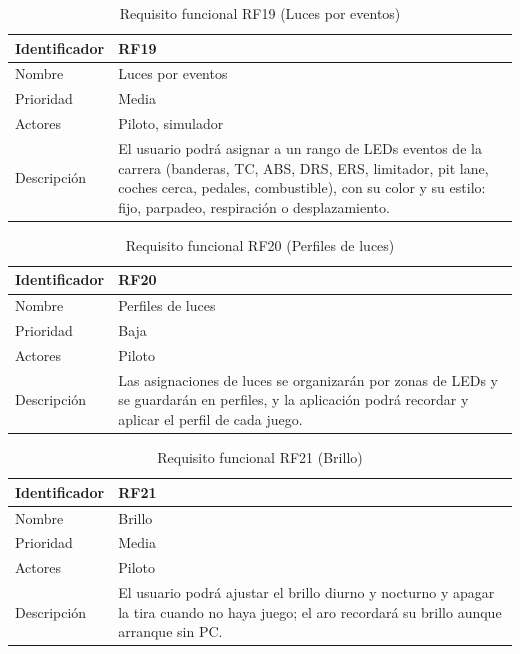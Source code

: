 \begin{table}[H]
	\centering
	\renewcommand{\arraystretch}{2}
	\begin{tabular}{|l|p{10cm}|}
		\hline
		Identificador & RF19 \\
		\hline
		Nombre & Luces por eventos \\
		\hline
		Prioridad & Media \\
		\hline
		Actores & Piloto, simulador \\
		\hline
		Descripción & El usuario podrá asignar a un rango de LEDs eventos de la carrera (banderas, TC, ABS, DRS, ERS, limitador, pit lane, coches cerca, pedales, combustible), con su color y su estilo: fijo, parpadeo, respiración o desplazamiento. \\
		\hline
	\end{tabular}
	\caption{Requisito funcional RF19 (Luces por eventos)}
	\label{tab:rf19}
\end{table}

\begin{table}[H]
	\centering
	\renewcommand{\arraystretch}{2}
	\begin{tabular}{|l|p{10cm}|}
		\hline
		Identificador & RF20 \\
		\hline
		Nombre & Perfiles de luces \\
		\hline
		Prioridad & Baja \\
		\hline
		Actores & Piloto \\
		\hline
		Descripción & Las asignaciones de luces se organizarán por zonas de LEDs y se guardarán en perfiles, y la aplicación podrá recordar y aplicar el perfil de cada juego. \\
		\hline
	\end{tabular}
	\caption{Requisito funcional RF20 (Perfiles de luces)}
	\label{tab:rf20}
\end{table}

\begin{table}[H]
	\centering
	\renewcommand{\arraystretch}{2}
	\begin{tabular}{|l|p{10cm}|}
		\hline
		Identificador & RF21 \\
		\hline
		Nombre & Brillo \\
		\hline
		Prioridad & Media \\
		\hline
		Actores & Piloto \\
		\hline
		Descripción & El usuario podrá ajustar el brillo diurno y nocturno y apagar la tira cuando no haya juego; el aro recordará su brillo aunque arranque sin PC. \\
		\hline
	\end{tabular}
	\caption{Requisito funcional RF21 (Brillo)}
	\label{tab:rf21}
\end{table}


